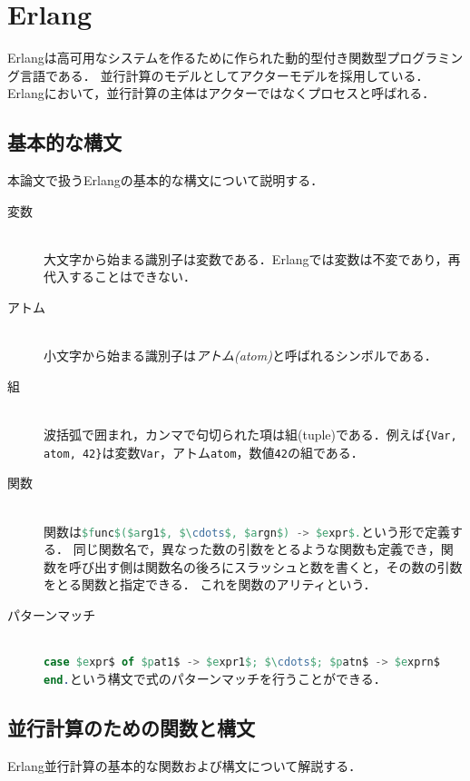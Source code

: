 \section{Erlang}

Erlang\cite{Erlang}は高可用なシステムを作るために作られた動的型付き関数型プログラミング言語である．
並行計算のモデルとしてアクターモデルを採用している．
Erlangにおいて，並行計算の主体はアクターではなくプロセスと呼ばれる．

\subsection{基本的な構文}

本論文で扱うErlangの基本的な構文について説明する．

\begin{description}
\item[変数]\mbox{}\\
  大文字から始まる識別子は変数である．Erlangでは変数は不変であり，再代入することはできない．
\item[アトム]\mbox{}\\
  小文字から始まる識別子は\emph{アトム(atom)}と呼ばれるシンボルである．
\item[組]\mbox{}\\
  波括弧で囲まれ，カンマで句切られた項は組(tuple)である．例えば\lstinline|{Var, atom, 42}|は変数\lstinline{Var}，アトム\lstinline{atom}，数値\lstinline{42}の組である．
\item[関数]\mbox{}\\
  関数は\lstinline[language=Erlang]{$func$($arg1$, $\cdots$, $argn$) -> $expr$.}という形で定義する．
  同じ関数名で，異なった数の引数をとるような関数も定義でき，関数を呼び出す側は関数名の後ろにスラッシュと数を書くと，その数の引数をとる関数と指定できる．
  これを関数のアリティという．
\item[パターンマッチ]\mbox{}\\
  \lstinline[language=Erlang]{case $expr$ of $pat1$ -> $expr1$; $\cdots$; $patn$ -> $exprn$ end.}という構文で式のパターンマッチを行うことができる．
\end{description}

\subsection{並行計算のための関数と構文}

Erlang並行計算の基本的な関数および構文について解説する．

